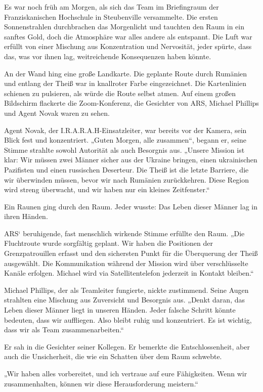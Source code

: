 \documentclass[
]{article}
\begin{document}
Es war noch früh am Morgen, als sich das Team im Briefingraum der Franziskanischen Hochschule in Steubenville versammelte. Die ersten Sonnenstrahlen durchbrachen das Morgenlicht und tauchten den Raum in ein sanftes Gold, doch die Atmosphäre war alles andere als entspannt. Die Luft war erfüllt von einer Mischung aus Konzentration und Nervosität, jeder spürte, dass das, was vor ihnen lag, weitreichende Konsequenzen haben könnte.

An der Wand hing eine große Landkarte. Die geplante Route durch Rumänien und entlang der Theiß war in knallroter Farbe eingezeichnet. Die Kartenlinien schienen zu pulsieren, als würde die Route selbst atmen. Auf einem großen Bildschirm flackerte die Zoom-Konferenz, die Gesichter von ARS, Michael Phillips und Agent Novak waren zu sehen.

Agent Novak, der I.R.A.R.A.H-Einsatzleiter, war bereits vor der Kamera, sein Blick fest und konzentriert. „Guten Morgen, alle zusammen``, begann er, seine Stimme strahlte sowohl Autorität als auch Besorgnis aus. „Unsere Mission ist klar: Wir müssen zwei Männer sicher aus der Ukraine bringen, einen ukrainischen Pazifisten und einen russischen Deserteur. Die Theiß ist die letzte Barriere, die wir überwinden müssen, bevor wir nach Rumänien zurückkehren. Diese Region wird streng überwacht, und wir haben nur ein kleines Zeitfenster.``

Ein Raunen ging durch den Raum. Jeder wusste: Das Leben dieser Männer lag in ihren Händen.

ARS` beruhigende, fast menschlich wirkende Stimme erfüllte den Raum. „Die Fluchtroute wurde sorgfältig geplant. Wir haben die Positionen der Grenzpatrouillen erfasst und den sichersten Punkt für die Überquerung der Theiß ausgewählt. Die Kommunikation während der Mission wird über verschlüsselte Kanäle erfolgen. Michael wird via Satellitentelefon jederzeit in Kontakt bleiben.``

Michael Phillips, der als Teamleiter fungierte, nickte zustimmend. Seine Augen strahlten eine Mischung aus Zuversicht und Besorgnis aus. „Denkt daran, das Leben dieser Männer liegt in unseren Händen. Jeder falsche Schritt könnte bedeuten, dass wir auffliegen. Also bleibt ruhig und konzentriert. Es ist wichtig, dass wir als Team zusammenarbeiten.``

Er sah in die Gesichter seiner Kollegen. Er bemerkte die Entschlossenheit, aber auch die Unsicherheit, die wie ein Schatten über dem Raum schwebte.

„Wir haben alles vorbereitet, und ich vertraue auf eure Fähigkeiten. Wenn wir zusammenhalten, können wir diese Herausforderung meistern.``
\end{document}
